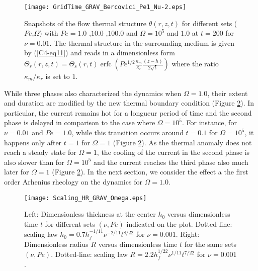 \begin{figure}[h!]
  \begin{center}
    \graphicspath{ {/Users/thorey/Documents/These/Projet/Refroidissement/Skin_Model/Figure/Figure_Heating/} }
    \texttt{[image: GridTime\_GRAV\_Bercovici\_Pe1\_Nu-2.eps]}
    \caption{Snapshots of  the flow thermal  structure $\theta(r,z,t)$
      for  different  sets  ($Pe$,$\Omega$)  with  $Pe=  1.0$  ,$10.0$
      ,$100.0$   and   $\Omega=10^5$   and  $1.0$   at   $t=200$   for
      $\nu=0.01$. The  thermal structure in the  surrounding medium is
      given  by  (\ref{C4-eq11}) and  reads  in  a dimensionless  form
      $\Theta_r(r,z,t)=\Theta_s(r,t)\operatorname{erfc}{\left(Pe^{1/2}\frac{\kappa_m}{\kappa_r}\frac{(z-h)}{2\sqrt{t}}\right)}$
      where the ratio $\kappa_m/\kappa_r$ is set to $1$.}
    \label{C4-Grid_TIME_GRAV}
  \end{center}
\end{figure}

While three phases also  characterized the dynamics when $\Omega=1.0$,
their extent  and duration  are modified by  the new  thermal boundary
condition (Figure \ref{C4-Scaling_HR_GRAV_Omega}).  In particular, the
current remains hot for a longueur period of time and the second phase
is  delayed in  comparison  to  the case  where  $\Omega =10^5$.   For
instance, for  $\nu=0.01$ and  $Pe=1.0$, while this  transition occurs
around  $t=0.1$ for  $\Omega=10^5$, it  happens only  after $t=1$  for
$\Omega=1$  (Figure \ref{C4-Scaling_HR_GRAV_Omega}).   As the  thermal
anomaly does not  reach a steady state for $\Omega=1$,  the cooling of
the current in the second phase  is also slower than for $\Omega=10^5$
and the current reaches the third phase also much later for $\Omega=1$
(Figure  \ref{C4-Scaling_HR_GRAV_Omega}).   In  the next  section,  we
consider  the  effect a  the  first  order  Arhenius rheology  on  the
dynamics for $\Omega=1.0$.

\begin{figure}[htpb]
  \begin{center}
    \graphicspath{ {/Users/thorey/Documents/These/Projet/Refroidissement/Skin_Model/Figure/Figure_Heating/} }
    \texttt{[image: Scaling\_HR\_GRAV\_Omega.eps]}
    \caption{Left: Dimensionless thickness at  the center $h_0$ versus
      dimensionless time  $t$ for different sets  $(\nu,Pe)$ indicated
      on      the      plot.        Dotted-line:      scaling      law
      $h_0=  0.7h_f^{-1/11}\nu^{-2/11}t^{8/22}$  for  $\nu  =  0.001$.
      Right: Dimensionless  radius $R$  versus dimensionless  time $t$
      for  the   same  sets  $(\nu,Pe)$.   Dotted-line:   scaling  law
      $R= 2.2h_f^{1/22}\nu^{1/11}t^{7/22}$ for $\nu = 0.001$.}
    \label{C4-Scaling_HR_GRAV_Omega}
  \end{center}
\end{figure}

